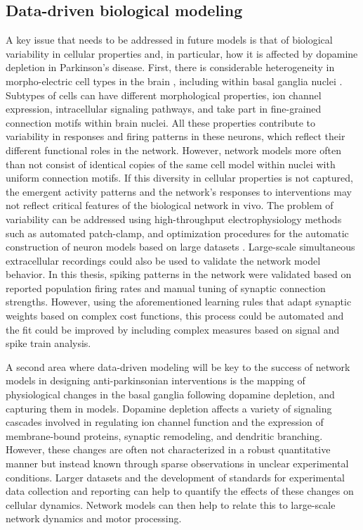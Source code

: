 \subsection{Data-driven biological modeling}
%
%
%
%
%
%
%
%
%
%
%
%
%
%
%
%
%
%
%
A key issue that needs to be addressed in future models is that of biological variability
in cellular properties and, in particular, how it is affected by dopamine depletion
in Parkinson's disease. First, there is considerable heterogeneity in
morpho-electric cell types in the brain \cite{ramaswamy_neocortical_2015,zeng_neuronal_2017},
including within basal ganglia nuclei \cite{mallet_dichotomous_2012,sharott_different_2009,sharott_population_2017}.
Subtypes of cells can have different morphological properties,
ion channel expression, intracellular signaling pathways, and
take part in fine-grained connection motifs within brain nuclei.
All these properties contribute to variability in responses and firing
patterns in these neurons, which reflect their different functional
roles in the network. However, network models more often than not consist of
identical copies of the same cell model within nuclei with uniform connection motifs.
If this diversity in cellular properties is not captured, the emergent
activity patterns and the network's responses to interventions may not
reflect critical features of the biological network in vivo.
%
The problem of variability can be addressed using high-throughput
electrophysiology methods such as automated patch-clamp, and optimization
procedures for the automatic construction of neuron models based on large datasets \cite{gouwens_systematic_2018,pozzorini_automated_2015}.
%
%
Large-scale simultaneous extracellular recordings could also be used to validate
the network model behavior. In this thesis, spiking patterns in the network
were validated based on reported population firing rates and manual tuning
of synaptic connection strengths. However, using the aforementioned learning
rules that adapt synaptic weights based on complex %
cost functions, this process could be automated and the fit could be improved
by including complex measures based on signal and spike train analysis.

A second area where data-driven modeling will be key to the success of
network models in designing anti-parkinsonian interventions is the mapping of
physiological changes in the basal ganglia following dopamine depletion,
and capturing them in models. Dopamine depletion affects a variety of
signaling cascades involved in regulating ion channel function and the expression
of membrane-bound proteins, synaptic remodeling, and dendritic branching.
However, these changes are often not characterized in a robust quantitative manner
but instead known through sparse observations in unclear experimental conditions.
Larger datasets and the development of standards for experimental data collection
and reporting can help to quantify the effects of these changes on cellular dynamics.
Network models can then help to relate this to large-scale network dynamics and motor processing.
%

